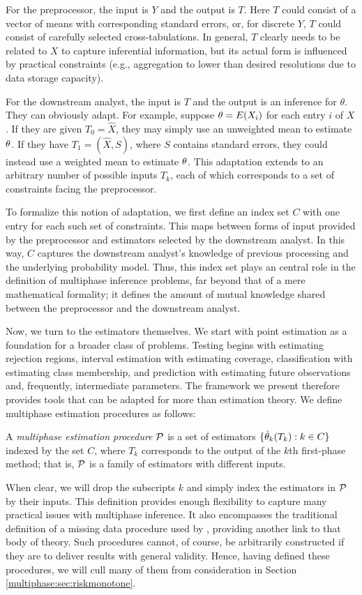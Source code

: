 For the preprocessor, the input  is $Y$ and the output is $T$.
 Here  $T$ could consist of a vector of means with corresponding standard errors, or,  for discrete $Y$, $T$ could consist of carefully selected cross-tabulations.
In general, $T$ clearly needs to be related to $X$ to capture inferential information, but its actual form is influenced by practical constraints (e.g., aggregation to lower than desired resolutions due to data storage capacity).

For the downstream analyst, the input is $T$ and the output is an inference for $\theta$. 
They can obviously adapt. 
For example, suppose $\theta = E(X_i)$ for each entry $i$ of $X$.
If they are given $T_0 = \hat{X}$, they may simply use an unweighted mean to estimate $\theta$.
If they have $T_1 = (\hat{X}, S)$, where $S$ contains standard errors, they could instead use a weighted mean to estimate $\theta$.
This adaptation extends to an arbitrary number of possible inputs $T_k$, each of which corresponds to a set of constraints facing the preprocessor.

To formalize this notion of adaptation, we first define an index set $C$ with one entry for each such set of constraints.
This maps between forms of input provided by the preprocessor and estimators selected by the downstream analyst.
In this way, $C$ captures the downstream analyst's knowledge of previous processing and the underlying probability model.
Thus, this index set plays an central role in the definition of multiphase inference problems, far beyond that of a mere mathematical formality; it defines the amount of mutual knowledge shared between the preprocessor and the downstream analyst.

Now, we turn to the estimators themselves.
We start with point estimation as a foundation for a broader class of problems.
Testing begins with estimating rejection regions, interval estimation with estimating coverage, classification with estimating class membership, and prediction with estimating future observations and, frequently, intermediate parameters.
The framework we present therefore provides tools that can be adapted for more than estimation theory.
We define multiphase estimation procedures as follows:
%
\begin{definition}
A \emph{multiphase estimation procedure} $\mathcal{P}$ is a set of estimators $\{\hat{\theta}_k(T_k) : k \in C \}$ indexed by the set $C$, where $T_k$ corresponds to the output of the $k$th first-phase method; that is, $\mathcal{P}$ is a family of estimators with different inputs.
\end{definition}
%
When clear, we will drop the subscripts $k$ and simply index the estimators in $\mathcal{P}$ by their inputs.
This definition provides enough flexibility to capture many practical issues with multiphase inference.
It also encompasses the traditional definition of a missing data procedure used by \citet{Meng1994}, providing another link to that body of theory.
Such procedures cannot, of course, be arbitrarily constructed if they are to deliver results with general validity.
Hence, having defined these procedures, we will cull many of them from consideration in Section \ref{multiphase:sec:riskmonotone}.


